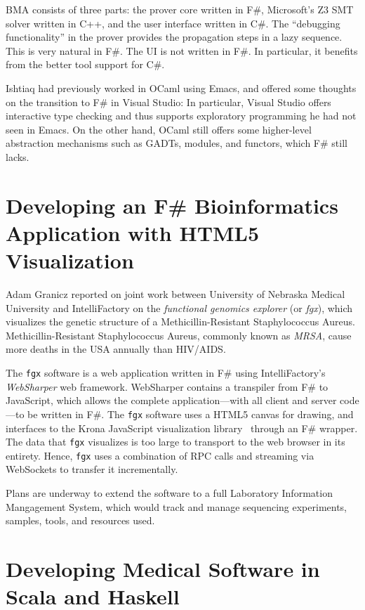 \documentclass{jfp1}
\begin{document}
BMA consists of three parts: the prover core written in F\#,
Microsoft's Z3 SMT solver written in C++, and the user interface written in C\#.  The ``debugging functionality''
in the prover provides the propagation steps in a lazy sequence.  This
is very natural in F\#.  The UI is not written in F\#.  In particular,
it benefits from the better tool support for C\#.

Ishtiaq had previously worked in OCaml using Emacs, and offered some
thoughts on the transition to F\# in Visual Studio: In particular,
Visual Studio offers interactive type checking and thus supports
exploratory programming he had not seen in Emacs.  On the other hand,
OCaml still offers some higher-level abstraction mechanisms such as
GADTs, modules, and functors, which F\# still lacks.

\section{Developing an F\# Bioinformatics Application with HTML5 Visualization}

Adam Granicz reported on joint work between University of Nebraska
Medical University and IntelliFactory on the \textit{functional
  genomics explorer} (or \textit{fgx}), which visualizes the genetic structure of a
Methicillin-Resistant Staphylococcus Aureus.  Methicillin-Resistant
Staphylococcus Aureus, commonly known as \textit{MRSA},
cause more deaths in the USA annually than HIV/AIDS.

The {\tt fgx} software is a web application written in F\# using
IntelliFactory's \textit{WebSharper} web framework.  WebSharper
contains a transpiler from F\# to JavaScript, which allows the
complete application---with all client and server code---to be
written in F\#.  The {\tt fgx} software uses a HTML5 canvas for drawing, and
interfaces to the Krona JavaScript visualization
library~\cite{OndovBergmanPhilippy2011} through an F\# wrapper.  The
data that {\tt fgx} visualizes is too large to transport to the web browser
in its entirety.  Hence, {\tt fgx} uses a combination of RPC calls and streaming via
WebSockets to transfer it incrementally.

Plans are underway to extend the software to a full Laboratory
Information Mangagement System, which would track and manage
sequencing experiments, samples, tools, and resources used.

\section{Developing Medical Software in Scala and Haskell}
\end{document}
